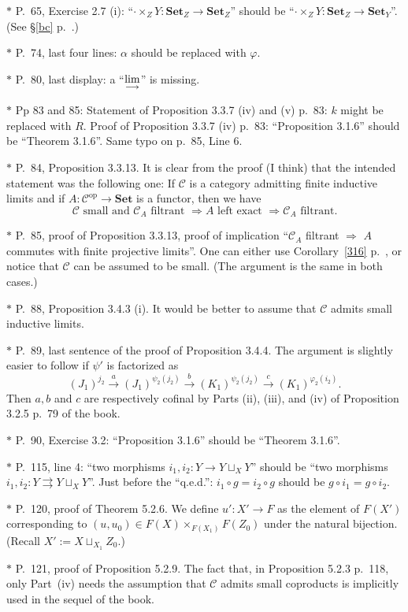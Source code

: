 \documentclass[12pt]{article}%
\theoremstyle{remark}
\theoremstyle{definition}
\newcommand{\C}{\mathcal C}
\newcommand{\Set}{\mathbf{Set}}
\newcommand{\parar}{\rightrightarrows}
\newcommand{\then}{\Rightarrow}
\newcommand{\xr}{\xrightarrow}
\newcommand{\ilim}{\operatornamewithlimits{\underset{\longrightarrow}{lim}}}
\DeclareMathOperator{\op}{op}
\begin{document}
\noindent $*$ P.~65, Exercise 2.7 (i): ``$\cdot\times_ZY:\Set_Z\to\Set_Z$'' should be ``$\cdot\times_ZY:\Set_Z\to\Set_Y$''. (See \S\ref{bc} p.~\pageref{bc}.) 

\noindent $*$ P.~74, last four lines: $\alpha$ should be replaced with $\varphi$.

\noindent $*$ P.~80, last display: a ``$\ds\ilim$'' is missing.

\noindent $*$ Pp 83 and 85: Statement of Proposition 3.3.7 (iv) and (v) p.~83: $k$ might be replaced with $R$. Proof of Proposition 3.3.7 (iv) p.~83: ``Proposition 3.1.6'' should be ``Theorem 3.1.6''. Same typo on p.~85, Line 6.

\noindent $*$ P.~84, Proposition 3.3.13. It is clear from the proof (I think) that the intended statement was the following one: If $\C$ is a category admitting finite inductive limits and if $A:\C^{\op}\to\Set$ is a functor, then we have 
$$
\C\text{ small and }\C_A\text{ filtrant }\then A\text{ left exact }\then\C_A\text{ filtrant}.
$$

\noindent $*$ P.~85, proof of Proposition 3.3.13, proof of implication ``$\C_A$ filtrant $\then$ $A$ commutes with finite projective limits''. One can either use Corollary~\ref{316} p.~\pageref{316}, or notice that $\C$ can be assumed to be small. (The argument is the same in both cases.)

\noindent $*$ P.~88, Proposition 3.4.3 (i). It would be better to assume that $\C$ admits small inductive limits.

\noindent $*$ P.~89, last sentence of the proof of Proposition 3.4.4. The argument is slightly easier to follow if $\psi'$ is factorized as 
$$
(J_1)^{j_2}\xr a(J_1)^{\psi_2(j_2)}\xr b(K_1)^{\psi_2(j_2)}\xr c(K_1)^{\varphi_2(i_2)}.
$$ 
Then $a,b$ and $c$ are respectively cofinal by Parts (ii), (iii), and (iv) of Proposition 3.2.5 p.~79 of the book.

\noindent $*$ P.~90, Exercise 3.2: ``Proposition 3.1.6'' should be ``Theorem 3.1.6''.

\noindent $*$ P.~115, line 4: ``two morphisms $i_1,i_2:Y\to Y\sqcup_XY$'' should be ``two morphisms $i_1,i_2:Y\parar Y\sqcup_XY$''. Just before the ``q.e.d.'': $i_1\circ g=i_2\circ g$ should be $g\circ i_1=g\circ i_2$.

\noindent $*$ P.~120, proof of Theorem 5.2.6. We define $u':X'\to F$ as the element of $F(X')$ corresponding to $(u,u_0)\in F(X)\times_{F(X_1)}F(Z_0)$ under the natural bijection. (Recall $X':=X\sqcup_{X_1}Z_0$.)

\noindent $*$ P.~121, proof of Proposition 5.2.9. The fact that, in Proposition 5.2.3 p.~118, only Part~(iv) needs the assumption that $\C$ admits small coproducts is implicitly used in the sequel of the book.
\end{document}
